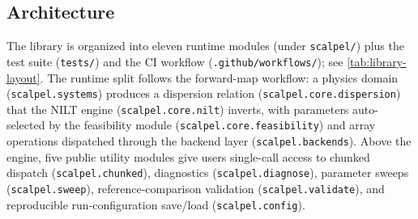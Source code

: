 \documentclass[manuscript,review]{acmart}
\begin{document}
\subsection{Architecture}

The library is organized into eleven runtime modules
(under \texttt{scalpel/}) plus the test suite (\texttt{tests/}) and
the CI workflow (\texttt{.github/workflows/}); see
\cref{tab:library-layout}. The runtime split
follows the forward-map workflow: a physics domain
(\texttt{scalpel.systems}) produces a dispersion relation
(\texttt{scalpel.core.dispersion}) that the NILT engine
(\texttt{scalpel.core.nilt}) inverts, with parameters auto-selected
by the feasibility module (\texttt{scalpel.core.feasibility}) and
array operations dispatched through the backend layer
(\texttt{scalpel.backends}). Above the engine, five public utility
modules give users single-call access to chunked dispatch
(\texttt{scalpel.chunked}), diagnostics
(\texttt{scalpel.diagnose}), parameter sweeps
(\texttt{scalpel.sweep}), reference-comparison validation
(\texttt{scalpel.validate}), and reproducible run-configuration
save/load (\texttt{scalpel.config}).
\end{document}
